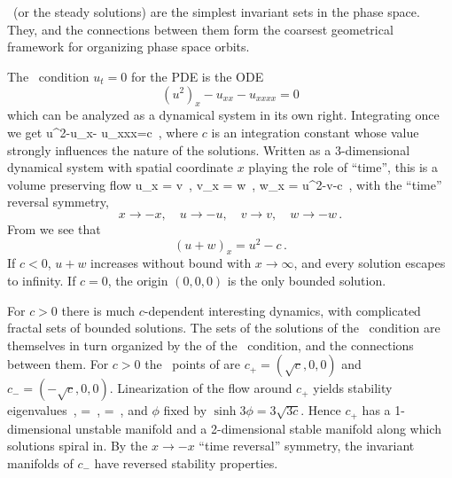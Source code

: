 
\section{\Eqva} %
\label{sec:stks}


\noindent
\Eqva\  (or the steady solutions)
are the simplest invariant sets in
the phase space. They,  and 
the connections between them form the
coarsest geometrical framework for organizing
phase space orbits. %

The \eqv\ condition $u_t=0$ for the {\KSe} PDE  
is the ODE
\[
(u^2)_x-u_{xx}- u_{xxxx}=0 
\]
which can be analyzed as a dynamical system in its own right.
Integrating once we get
\beq
u^2-u_x- u_{xxx}=c 
\,,
\label{eq:stdks}
\eeq
where $c$ is an integration constant 
whose value strongly influences the nature of
the solutions. %
Written as a 3-dimensional dynamical system
with spatial coordinate $x$ playing the role of ``time'',
this is a volume preserving flow
\beq
u_x = v \,,\qquad
v_x = w \,,\qquad
w_x = u^2-v-c \,,
  \label{eq:3dks}
\eeq
with the ``time'' reversal symmetry, 
\[
x \to -x,\quad u \to -u, \quad v \to v, \quad w \to -w \,.
\]
 From  we see that
\[
(u+w)_x=u^2-c \,.
\]
If $c<0$, $u+w$ increases without bound with $x \to \infty$,
and every solution escapes to infinity.
If $c=0$, the origin $(0,0,0)$ is the
only bounded solution. 

For $c>0$ there is much
$c$-dependent interesting dynamics, with
complicated fractal sets of bounded solutions.
The sets of the solutions of the \eqv\ condition 
 are themselves in turn organized by the  
{\eqva} of the \eqv\ condition, and 
the connections between them.
    For $c>0$ the \eqv\ points of  are
$c_{+}=(\sqrt{c},0,0)$ and $c_{-}=(-\sqrt{c},0,0)$.
Linearization of the flow around
$c_{+}$ yields 
stability eigenvalues 
\,,\qquad
\lambda=\sinh \phi
\,,\qquad
\theta=\cosh \phi \, ,
\label{eqvEqvEigV}
\eeq
and $\phi$ fixed by $\sinh 3\phi=3\sqrt{3c}$. 
Hence $c_{+}$ has a {1-dimensional}
unstable manifold and a 2-dimensional
stable manifold along which solutions spiral 
in. 
By the $x \to -x$ ``time reversal'' symmetry, the 
invariant manifolds of $c_{-}$ 
have reversed stability properties.

